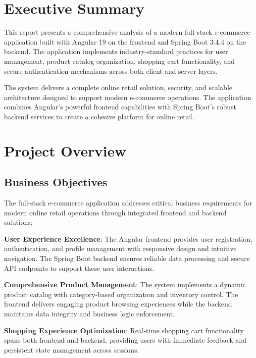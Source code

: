 \documentclass[12pt,a4paper]{article}
\begin{document}


\newpage
\tableofcontents
\newpage

\section{Executive Summary}

This report presents a comprehensive analysis of a modern full-stack e-commerce application built with Angular 19 on the frontend and Spring Boot 3.4.4 on the backend. The application implements industry-standard practices for user management, product catalog organization, shopping cart functionality, and secure authentication mechanisms across both client and server layers.

The system delivers a complete online retail solution, security, and scalable architecture designed to support modern e-commerce operations. The application combines Angular's powerful frontend capabilities with Spring Boot's robust backend services to create a cohesive platform for online retail.

\section{Project Overview}

\subsection{Business Objectives}

The full-stack e-commerce application addresses critical business requirements for modern online retail operations through integrated frontend and backend solutions:

\textbf{User Experience Excellence}: The Angular frontend provides user registration, authentication, and profile management with responsive design and intuitive navigation. The Spring Boot backend ensures reliable data processing and secure API endpoints to support these user interactions.

\textbf{Comprehensive Product Management}: The system implements a dynamic product catalog with category-based organization and inventory control. The frontend delivers engaging product browsing experiences while the backend maintains data integrity and business logic enforcement.

\textbf{Shopping Experience Optimization}: Real-time shopping cart functionality spans both frontend and backend, providing users with immediate feedback and persistent state management across sessions.
\end{document}

